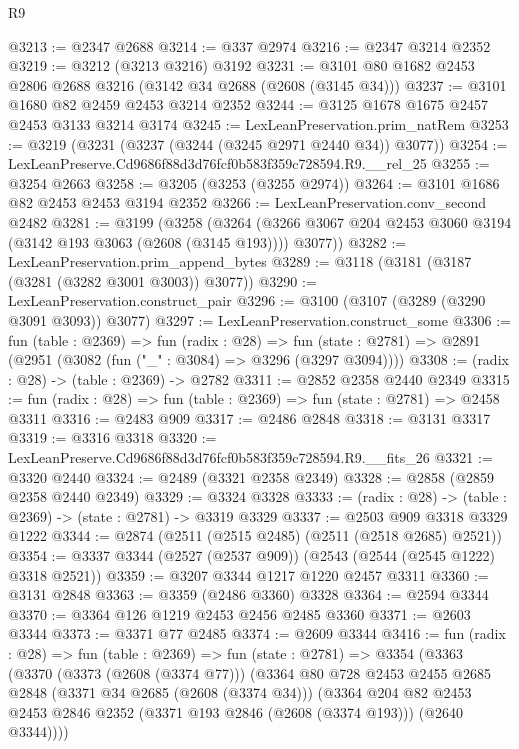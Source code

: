 \begin{lexlean}{R9}
\begin{coremodule}
@3213 := @2347 @2688
@3214 := @337 @2974
@3216 := @2347 @3214 @2352
@3219 := @3212 (@3213 @3216) @3192
@3231 := @3101 @80 @1682 @2453 @2806 @2688 @3216 (@3142 @34 @2688 (@2608 (@3145 @34)))
@3237 := @3101 @1680 @82 @2459 @2453 @3214 @2352
@3244 := @3125 @1678 @1675 @2457 @2453 @3133 @3214 @3174
@3245 := LexLeanPreservation.prim_natRem
@3253 := @3219 (@3231 (@3237 (@3244 (@3245 @2971 @2440 @34)) @3077))
@3254 := LexLeanPreserve.Cd9686f88d3d76fcf0b583f359c728594.R9.__rel_25
@3255 := @3254 @2663
@3258 := @3205 (@3253 (@3255 @2974))
@3264 := @3101 @1686 @82 @2453 @2453 @3194 @2352
@3266 := LexLeanPreservation.conv_second @2482
@3281 := @3199
    (@3258
      (@3264 (@3266 @3067 @204 @2453 @3060 @3194 (@3142 @193 @3063 (@2608 (@3145 @193)))) @3077))
@3282 := LexLeanPreservation.prim_append_bytes
@3289 := @3118 (@3181 (@3187 (@3281 (@3282 @3001 @3003)) @3077))
@3290 := LexLeanPreservation.construct_pair
@3296 := @3100 (@3107 (@3289 (@3290 @3091 @3093)) @3077)
@3297 := LexLeanPreservation.construct_some
@3306 := fun (table : @2369) =>
  fun (radix : @28) =>
  fun (state : @2781) => @2891 (@2951 (@3082 (fun ("_" : @3084) => @3296 (@3297 @3094))))
@3308 := (radix : @28) -> (table : @2369) -> @2782
@3311 := @2852 @2358 @2440 @2349
@3315 := fun (radix : @28) => fun (table : @2369) => fun (state : @2781) => @2458 @3311
@3316 := @2483 @909
@3317 := @2486 @2848
@3318 := @3131 @3317
@3319 := @3316 @3318
@3320 := LexLeanPreserve.Cd9686f88d3d76fcf0b583f359c728594.R9.__fits_26
@3321 := @3320 @2440
@3324 := @2489 (@3321 @2358 @2349)
@3328 := @2858 (@2859 @2358 @2440 @2349)
@3329 := @3324 @3328
@3333 := (radix : @28) -> (table : @2369) -> (state : @2781) -> @3319 @3329
@3337 := @2503 @909 @3318 @3329 @1222
@3344 := @2874 (@2511 (@2515 @2485) (@2511 (@2518 @2685) @2521))
@3354 := @3337 @3344 (@2527 (@2537 @909)) (@2543 (@2544 (@2545 @1222) @3318 @2521))
@3359 := @3207 @3344 @1217 @1220 @2457 @3311
@3360 := @3131 @2848
@3363 := @3359 (@2486 @3360) @3328
@3364 := @2594 @3344
@3370 := @3364 @126 @1219 @2453 @2456 @2485 @3360
@3371 := @2603 @3344
@3373 := @3371 @77 @2485
@3374 := @2609 @3344
@3416 := fun (radix : @28) =>
  fun (table : @2369) =>
  fun (state : @2781) =>
  @3354
    (@3363
      (@3370
        (@3373 (@2608 (@3374 @77)))
        (@3364
          @80
          @728
          @2453
          @2455
          @2685
          @2848
          (@3371 @34 @2685 (@2608 (@3374 @34)))
          (@3364
            @204
            @82
            @2453
            @2453
            @2846
            @2352
            (@3371 @193 @2846 (@2608 (@3374 @193)))
            (@2640 @3344))))

\end{coremodule}
\end{lexlean}
